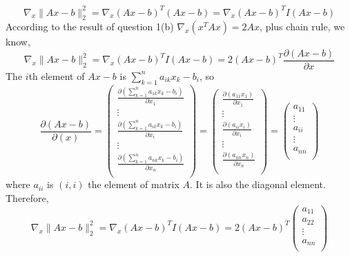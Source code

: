 \documentclass[12pt]{article}
\begin{document}
	\begin{equation}\label{Ax-b_grad_1}
	\nabla_x\lVert Ax-b\rVert_2^2
	=\nabla_x (Ax-b)^T(Ax-b)
	=\nabla_x (Ax-b)^TI(Ax-b)
	\end{equation}
	According to the result of question 1(b) $\nabla_x(x^TAx)=2Ax$, plus chain rule, we know,
	\begin{equation}\label{Ax-b_grad_2}
	\nabla_x\lVert Ax-b\rVert_2^2
	=\nabla_x (Ax-b)^TI(Ax-b)
	=2(Ax-b)^T\frac{\partial(Ax-b)}{\partial x}
	\end{equation}
	The $i$th element of $Ax-b$ is $\sum_{k=1}^n a_{ik}x_k-b_i$, so 
	\begin{equation}\label{Ax-b_grad_3}
	\frac{\partial(Ax-b)}{\partial(x)}
	=
	\left(  
	\begin{array}{c}  
	\frac{\partial(\sum_{k=1}^n a_{1k}x_k-b_i)}{\partial x_1} \\
	\vdots \\
	\frac{\partial(\sum_{k=1}^n a_{ik}x_k-b_i)}{\partial x_i} \\
	\vdots \\
	\frac{\partial(\sum_{k=1}^n a_{nk}x_k-b_i)}{\partial x_n} \\
	\end{array}
	\right)
	=
	\left(  
	\begin{array}{c}  
	\frac{\partial(a_{11}x_1)}{\partial x_1} \\
	\vdots \\
	\frac{\partial(a_{ii}x_i)}{\partial x_i} \\
	\vdots \\
	\frac{\partial(a_{nn}x_n)}{\partial x_n} \\
	\end{array}
	\right)
	=
	\left(  
	\begin{array}{c}  
	a_{11} \\
	\vdots \\
	a_{ii} \\
	\vdots \\
	a_{nn} \\
	\end{array}
	\right)
	\end{equation}
	where $a_{ii}$ is $(i, i)$ the element of matrix $A$. It is also the diagonal element.
	Therefore,
	\begin{equation}\label{Ax-b_grad_2}
	\nabla_x\lVert Ax-b\rVert_2^2
	=\nabla_x (Ax-b)^TI(Ax-b)
	=2(Ax-b)^T 
	\left(  
	\begin{array}{c}  
	a_{11} \\
	a_{22} \\
	\vdots \\
	a_{nn} \\
	\end{array}
	\right)
	\end{equation}
	
\end{document}
